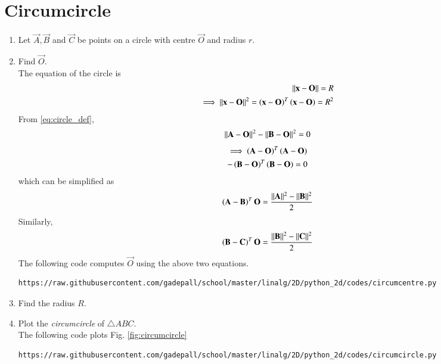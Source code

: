 \documentclass[journal,12pt,twocolumn]{IEEEtran}
\renewcommand\thesection{\arabic{section}}
\begin{document}
\section{Circumcircle}
%
\begin{enumerate}[label=\thesection.\arabic*
,ref=\thesection.\theenumi]

\item Let $\vec{A},\vec{B} $ and $\vec{C}$ be points on a circle with centre $\vec{O}$ and radius $r$.
\item Find $\vec{O}$.
\\
\solution The equation of the circle is 
\begin{align}
\label{eq:circle_def}
\lVert\mathbf{x}-\mathbf{O}\rVert = R
\\
\implies \lVert\mathbf{x}-\mathbf{O}\rVert^2 =\left(\mathbf{x}-\mathbf{O}\right)^T\left(\mathbf{x}-\mathbf{O}\right) = R^2
\end{align}
From \eqref{eq:circle_def},
\begin{align}
\label{eq:circle_AB}
\lVert\mathbf{A}-\mathbf{O}\rVert^2 - \lVert\mathbf{B}-\mathbf{O}\rVert^2  = 0
\end{align}
\begin{multline}
\implies \left(\mathbf{A}-\mathbf{O}\right)^T\left(\mathbf{A}-\mathbf{O}\right) 
\\
- \left(\mathbf{B}-\mathbf{O}\right)^T\left(\mathbf{B}-\mathbf{O}\right) = 0
\end{multline}
%
which can be simplified as
\begin{align}
\label{eq:circle_chord_ab}
\left(\mathbf{A}-\mathbf{B}\right)^T\mathbf{O} =   \frac{\lVert\mathbf{A}\rVert^2- \lVert\mathbf{B}\rVert^2}{2}
\end{align}
Similarly,
\begin{align}
\label{eq:circle_chord_bc}
\left(\mathbf{B}-\mathbf{C}\right)^T\mathbf{O} =   \frac{\lVert\mathbf{B}\rVert^2- \lVert\mathbf{C}\rVert^2}{2}
\end{align}
%
The following code computes $\vec{O}$ using the above two equations.
\begin{lstlisting}
https://raw.githubusercontent.com/gadepall/school/master/linalg/2D/python_2d/codes/circumcentre.py
\end{lstlisting}
\item Find the radius $R$.
\item Plot the {\em circumcircle} of $\triangle ABC$.
\\
\solution The following code plots Fig. \ref{fig:circumcircle}
\begin{lstlisting}
https://raw.githubusercontent.com/gadepall/school/master/linalg/2D/python_2d/codes/circumcircle.py
\end{lstlisting}

\end{enumerate}
\end{document}
